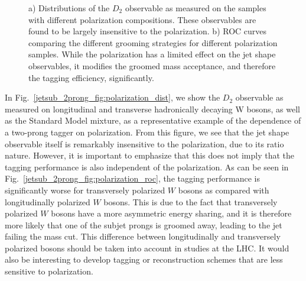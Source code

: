 \documentclass[11pt]{cernrep}
\begin{document}
\begin{figure}
\begin{center}
\end{center}
\caption{a) Distributions of the $D_2$ observable as measured on the samples with different polarization compositions. These observables are found to be largely insensitive to the polarization. b) ROC curves comparing the different grooming strategies for different polarization samples. While the polarization has a limited effect on the jet shape observables, it modifies the groomed mass acceptance, and therefore the tagging efficiency, significantly.}
\end{figure}


In Fig.~\ref{jetsub_2prong_fig:polarization_dist}, we show the $D_2$ observable as measured on longitudinal and transverse hadronically decaying W bosons, as well as the Standard Model mixture, as a representative example of the dependence of a two-prong tagger on polarization.
%
From this figure, we see that the jet shape observable itself is remarkably insensitive to the polarization, due to its ratio nature.
%
However, it is important to emphasize that this does not imply that the tagging performance is also independent of the polarization.
%
As can be seen in Fig.~\ref{jetsub_2prong_fig:polarization_roc}, the tagging performance is significantly worse for transversely polarized $W$ bosons as compared with longitudinally polarized $W$ bosons.
%
This is due to the fact that transversely polarized $W$ bosons have a more asymmetric energy sharing, and it is therefore more likely that one of the subjet prongs is groomed away, leading to the jet failing the mass cut.
%
This difference between longitudinally and transversely polarized bosons should be taken into account in studies at the LHC.
%
It would also be interesting to develop tagging or reconstruction schemes that are less sensitive to polarization.
\end{document}
